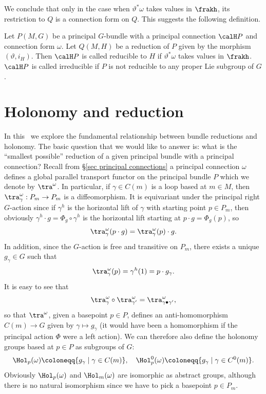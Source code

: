 We conclude that only in the case when $\vartheta^\ast\omega$ takes values in $\frakh$, its restriction to $Q$ is a connection form on $Q$. This suggests the following definition.

\begin{defn}
    Let $P(M,G)$ be a principal $G$-bundle with a principal connection $\calH P$ and connection form $\omega$. Let $Q(M,H)$ be a reduction of $P$ given by the morphism $(\vartheta,i_H)$. Then $\calH P$ is called reducible to $H$ if $\vartheta^\ast\omega$ takes values in $\frakh$. $\calH P$ is called irreducible if $P$ is not reducible to any proper Lie subgroup of $G$.
\end{defn}









\section{Holonomy and reduction}\label{sec holonomy}

In this \sect\ we explore the fundamental relationship between bundle reductions and holonomy. The basic question that we would like to answer is: what is the ``smallest possible'' reduction of a given principal bundle with a principal connection? Recall from \S\ref{sec principal connections} a principal connection $\omega$ defines a global parallel transport functor on the principal bundle $P$ which we denote by $\tra^\omega$. In particular, if $\gamma\in C(m)$ is a loop based at $m\in M$, then $\tra^\omega_\gamma:P_m\to P_m$ is a diffeomorphism. It is equivariant under the principal right $G$-action since if $\gamma^h$ is the horizontal lift of $\gamma$ with starting point $p\in P_m$, then obviously $\gamma^h\cdot g=\Phi_g\circ\gamma^h$ is the horizontal lift starting at $p\cdot g=\Phi_g(p)$, so
\[\tra_\gamma^\omega(p\cdot g)=\tra_\gamma^\omega(p)\cdot g.\label{eq 1.7.4 RS2}\]
In addition, since the $G$-action is free and transitive on $P_m$, there exists a unique $g_\gamma\in G$ such that
\[\tra_\gamma^\omega(p)=\gamma^h(1)=p\cdot g_\gamma.\label{eq 1.7.5 RS2}\]
It is easy to see that
\[\tra_{\gamma}^\omega\circ\tra_{\gamma'}^\omega=\tra_{\gamma\bullet\gamma'}^\omega,\]
so that $\tra^\omega$, given a basepoint $p\in P$, defines an anti-homomorphism $C(m)\to G$ given by $\gamma\mapsto g_\gamma$ (it would have been a homomorphism if the principal action $\Phi$ were a left action). We can therefore also define the holonomy groups based at $p\in P$ as subgroups of $G$:
\[\Hol_p(\omega)\coloneqq \{g_\gamma \mid \gamma\in C(m)\}, \quad \Hol_p^0(\omega)\coloneqq\{g_\gamma \mid \gamma\in C^0(m)\}.\]
Obviously $\Hol_p(\omega)$ and $\Hol_m(\omega)$ are isomorphic as abstract groups, although there is no natural isomorphism since we have to pick a basepoint $p\in P_m$.

